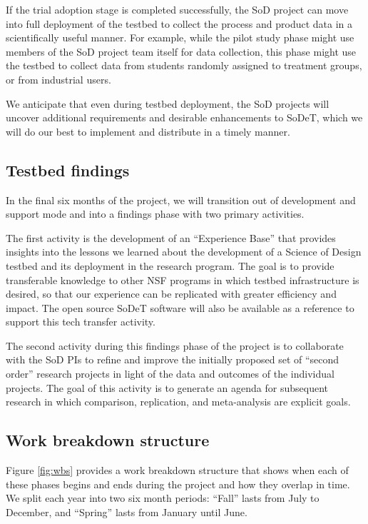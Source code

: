 If the trial adoption stage is completed successfully, the SoD project can
move into full deployment of the testbed to collect the process and product
data in a scientifically useful manner. For example, while the pilot study
phase might use members of the SoD project team itself for data collection,
this phase might use the testbed to collect data from students randomly
assigned to treatment groups, or from industrial users.

We anticipate that even during testbed deployment, the SoD projects will
uncover additional requirements and desirable enhancements to SoDeT, which
we will do our best to implement and distribute in a timely manner.

\subsection{Testbed findings}

In the final six months of the project, we will transition out of
development and support mode and into a findings phase with two primary
activities.

The first activity is the development of an ``Experience Base''
\cite{Basili94} that provides insights into the lessons we learned about the
development of a Science of Design testbed and its deployment in the
research program.  The goal is to provide transferable knowledge to other
NSF programs in which testbed infrastructure is desired, so that our
experience can be replicated with greater efficiency and impact.  The open
source SoDeT software will also be available as a reference to support this
tech transfer activity.

The second activity during this findings phase of the project is to
collaborate with the SoD PIs to refine and improve the initially proposed
set of ``second order'' research projects in light of the data and outcomes
of the individual projects.  The goal of this activity is to generate an
agenda for subsequent research in which comparison, replication, and
meta-analysis are explicit goals.

\subsection{Work breakdown structure}

Figure \ref{fig:wbs} provides a work breakdown structure that shows when
each of these phases begins and ends during the project and how they
overlap in time.  We split each year into two six month periods: ``Fall'' 
lasts from July to December, and ``Spring'' lasts from January until June.


